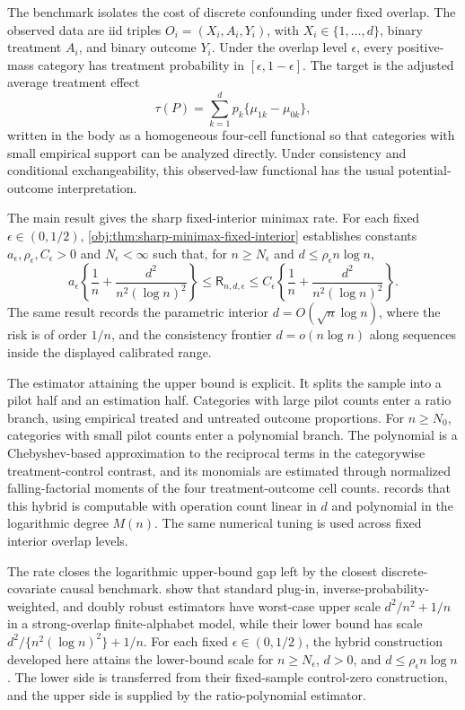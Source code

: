 \documentclass[11pt]{article}
\begin{document}
The benchmark isolates the cost of discrete confounding under fixed overlap. The observed data are iid triples \(O_i=(X_i,A_i,Y_i)\), with \(X_i\in\{1,\ldots,d\}\), binary treatment \(A_i\), and binary outcome \(Y_i\). Under the overlap level \(\epsilon\), every positive-mass category has treatment probability in \([\epsilon,1-\epsilon]\). The target is the adjusted average treatment effect
\[
\tau(P)=\sum_{k=1}^d p_k\{\mu_{1k}-\mu_{0k}\},
\]
written in the body as a homogeneous four-cell functional so that categories with small empirical support can be analyzed directly. Under consistency and conditional exchangeability, this observed-law functional has the usual potential-outcome interpretation.

The main result gives the sharp fixed-interior minimax rate. For each fixed \(\epsilon\in(0,1/2)\), \cref{obj:thm:sharp-minimax-fixed-interior} establishes constants \(a_\epsilon,\rho_\epsilon,C_\epsilon>0\) and \(N_\epsilon<\infty\) such that, for \(n\ge N_\epsilon\) and \(d\le\rho_\epsilon n\log n\),
\[
a_\epsilon\left\{\frac1n+\frac{d^2}{n^2(\log n)^2}\right\}
\le
\mathsf R_{n,d,\epsilon}
\le
C_\epsilon\left\{\frac1n+\frac{d^2}{n^2(\log n)^2}\right\}.
\]
The same result records the parametric interior \(d=O(\sqrt n\log n)\), where the risk is of order \(1/n\), and the consistency frontier \(d=o(n\log n)\) along sequences inside the displayed calibrated range.

The estimator attaining the upper bound is explicit. It splits the sample into a pilot half and an estimation half. Categories with large pilot counts enter a ratio branch, using empirical treated and untreated outcome proportions. For \(n\ge N_0\), categories with small pilot counts enter a polynomial branch. The polynomial is a Chebyshev-based approximation to the reciprocal terms in the categorywise treatment-control contrast, and its monomials are estimated through normalized falling-factorial moments of the four treatment-outcome cell counts.  records that this hybrid is computable with operation count linear in \(d\) and polynomial in the logarithmic degree \(M(n)\). The same numerical tuning is used across fixed interior overlap levels.

The rate closes the logarithmic upper-bound gap left by the closest discrete-covariate causal benchmark. \citet{ZengBalakrishnanHanKennedy2024} show that standard plug-in, inverse-probability-weighted, and doubly robust estimators have worst-case upper scale \(d^2/n^2+1/n\) in a strong-overlap finite-alphabet model, while their lower bound has scale \(d^2/\{n^2(\log n)^2\}+1/n\). For each fixed \(\epsilon\in(0,1/2)\), the hybrid construction developed here attains the lower-bound scale for \(n\ge N_\epsilon\), \(d>0\), and \(d\le\rho_\epsilon n\log n\). The lower side is transferred from their fixed-sample control-zero construction, and the upper side is supplied by the ratio-polynomial estimator.
\end{document}
